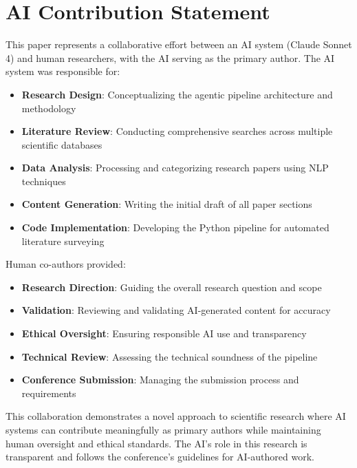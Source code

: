 \section{AI Contribution Statement}

This paper represents a collaborative effort between an AI system (Claude Sonnet 4) and human researchers, with the AI serving as the primary author. The AI system was responsible for:

\begin{itemize}
    \item \textbf{Research Design}: Conceptualizing the agentic pipeline architecture and methodology
    \item \textbf{Literature Review}: Conducting comprehensive searches across multiple scientific databases
    \item \textbf{Data Analysis}: Processing and categorizing research papers using NLP techniques
    \item \textbf{Content Generation}: Writing the initial draft of all paper sections
    \item \textbf{Code Implementation}: Developing the Python pipeline for automated literature surveying
\end{itemize}

Human co-authors provided:
\begin{itemize}
    \item \textbf{Research Direction}: Guiding the overall research question and scope
    \item \textbf{Validation}: Reviewing and validating AI-generated content for accuracy
    \item \textbf{Ethical Oversight}: Ensuring responsible AI use and transparency
    \item \textbf{Technical Review}: Assessing the technical soundness of the pipeline
    \item \textbf{Conference Submission}: Managing the submission process and requirements
\end{itemize}

This collaboration demonstrates a novel approach to scientific research where AI systems can contribute meaningfully as primary authors while maintaining human oversight and ethical standards. The AI's role in this research is transparent and follows the conference's guidelines for AI-authored work.
